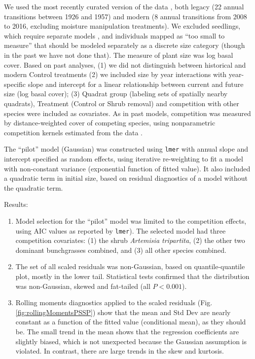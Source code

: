 \documentclass[11pt]{article}
\begin{document}
{We used the most recently curated version of the data \citep[][at doi.org/10.5061/dryad.96dn293]{Adler-2018},
both legacy (22 annual transitions between 1926 and 1957) and modern (8 annual transitions from
2008 to 2016, excluding moisture manipulation treatments). We excluded seedlings, which require separate models
\citep{Chu-2014a, Chu-2015, snyder-ellner-2018}, and individuals mapped as ``too small to measure'' that should be modeled separately
as a discrete size category (though in the past we have not done that). The measure of plant size was log basal cover. 
Based on past analyses, (1) we did not distinguish between historical and 
modern Control treatments \citep{Adler-2018} (2) we included size by year interactions with year-specific slope and intercept
for a linear relationship between current and future size (log basal cover); (3) Quadrat group (labeling sets of spatially
nearby quadrats), Treatment (Control or Shrub removal) and competition with other species were included as covariates. 
As in past models, competition was measured by distance-weighted cover of competing species, using nonparametric competition
kernels estimated from the data \citep{Teller-2016}. 

The ``pilot'' model (Gaussian) was constructed using \texttt{lmer} with annual slope and intercept specified 
as random effects, using iterative re-weighting to fit a model with non-constant variance (exponential function of fitted value). 
It also included a quadratic term in initial size, based on residual diagnostics of a model without the quadratic term. 

Results: \begin{enumerate}

\item Model selection for the ``pilot'' model was limited to the competition effects,  
using AIC values as reported by \texttt{lmer}). The selected model had  
three competition covariates: (1) the shrub \emph{Artemisia tripartita}, (2) the other two dominant 
bunchgrasses combined, and (3) all other species combined. 

\item The set of all scaled residuals was non-Gaussian, based on quantile-quantile plot, mostly in the lower tail. Statistical tests
confirmed that the distribution was non-Gaussian, skewed and fat-tailed (all $P<0.001$). 

\item Rolling moments diagnostics applied to the scaled residuals (Fig. \ref{fig:rollingMomentsPSSP}) show that the mean 
and Std Dev are nearly constant as a function of the fitted value (conditional mean), as they should be. The small trend in 
the mean shows that the regression coefficients are slightly biased, which is not unexpected because the Gaussian assumption is violated. 
In contrast, there are large trends in the skew and kurtosis. 


\end{enumerate}}
\end{document}
